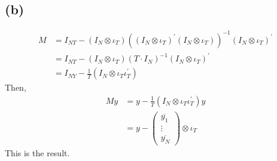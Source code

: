 \documentclass{article}
\begin{document}
\subsection{(b)}
\begin{align*}
	M &= I_{NT} - \left( I_N \otimes \iota_T \right) \left( \left( I_N \otimes \iota_T \right)^{'} \left( I_N \otimes \iota_T \right) \right)^{-1} \left( I_N \otimes \iota_T \right)^{'}\\[8pt]
	&= I_{NT} - \left( I_N \otimes \iota_T \right)(T\cdot I_N)^{-1} \left( I_N \otimes \iota_T \right)^{'}\\[8pt]
	&= I_{NY} - \frac{1}{T}\left( I_N \otimes \iota_T\iota_T^{'}\right)
\end{align*}
Then,
\begin{align*}
	My &= y - \frac{1}{T}\left( I_N \otimes \iota_T\iota_T^{'}\right)y\\[8pt]
	&= y - \left(\begin{array}{cc} \overline{y_1}\\ \vdots \\ \overline{y_N} \end{array}\right) \otimes \iota_T
\end{align*}
This is the result.
\end{document}

